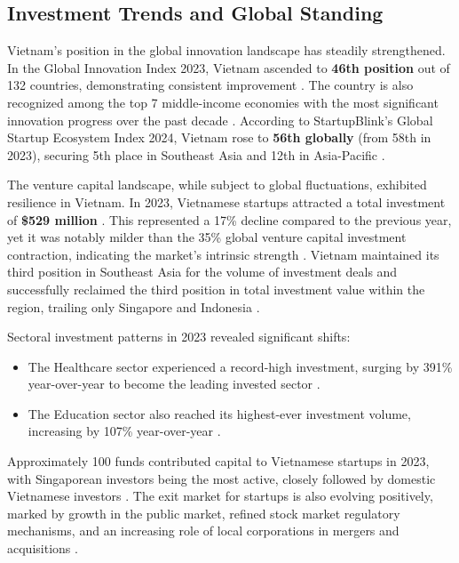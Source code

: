 \documentclass[../Main.tex]{subfiles}
\begin{document}
	\subsection{Investment Trends and Global Standing}
	Vietnam's position in the global innovation landscape has steadily strengthened. In the Global Innovation Index 2023, Vietnam ascended to \textbf{46th position} out of 132 countries, demonstrating consistent improvement \cite{vietnam_innovation_report_2024}. The country is also recognized among the top 7 middle-income economies with the most significant innovation progress over the past decade \cite{vietnam_innovation_report_2024}. According to StartupBlink's Global Startup Ecosystem Index 2024, Vietnam rose to \textbf{56th globally} (from 58th in 2023), securing 5th place in Southeast Asia and 12th in Asia-Pacific \cite{startupblink2024, vietnamnews2024pm}.

	The venture capital landscape, while subject to global fluctuations, exhibited resilience in Vietnam. In 2023, Vietnamese startups attracted a total investment of \textbf{\$529 million} \cite{vietnam_innovation_report_2024}. This represented a 17\% decline compared to the previous year, yet it was notably milder than the 35\% global venture capital investment contraction, indicating the market's intrinsic strength \cite{vietnam_innovation_report_2024}. Vietnam maintained its third position in Southeast Asia for the volume of investment deals and successfully reclaimed the third position in total investment value within the region, trailing only Singapore and Indonesia \cite{vietnam_innovation_report_2024}.

	Sectoral investment patterns in 2023 revealed significant shifts:
	\begin{itemize}
	\item The Healthcare sector experienced a record-high investment, surging by 391\% year-over-year to become the leading invested sector \cite{vietnam_innovation_report_2024}.
	\item The Education sector also reached its highest-ever investment volume, increasing by 107\% year-over-year \cite{vietnam_innovation_report_2024}.
	\end{itemize}
	Approximately 100 funds contributed capital to Vietnamese startups in 2023, with Singaporean investors being the most active, closely followed by domestic Vietnamese investors \cite{vietnam_innovation_report_2024}. The exit market for startups is also evolving positively, marked by growth in the public market, refined stock market regulatory mechanisms, and an increasing role of local corporations in mergers and acquisitions \cite{vietnam_innovation_report_2024}.
\end{document}
